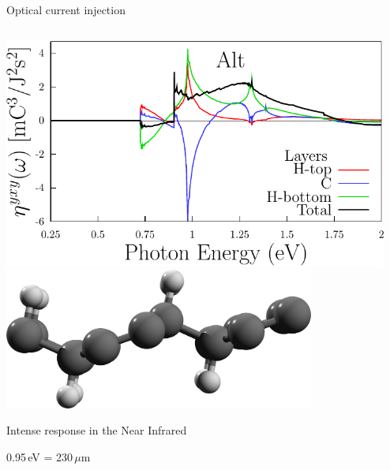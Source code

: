 \documentclass{beamer}
\begin{document}
\begin{frame}

\begin{center}
{\Large Optical current injection}
\end{center}

\begin{columns}

\begin{center}
\small

\includegraphics[width=0.99\textwidth]{figs/plots/eta-alt_y.pdf}
\vspace{3mm}
\includegraphics[width=0.8\textwidth]{figs/alt2.png}

Intense response in the Near Infrared

0.95\,eV = 230\,$\mu$m

\end{center}

\begin{center}
\small 


\end{center}
\end{columns}
\end{frame}
\end{document}
